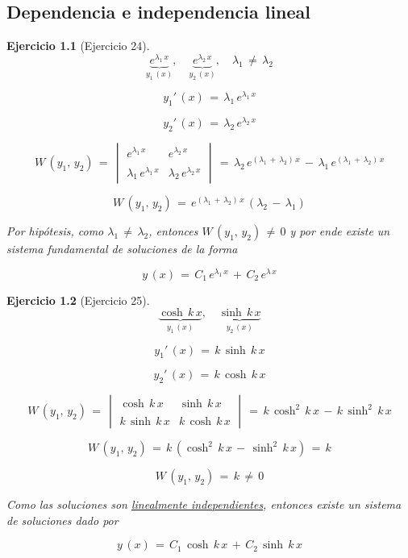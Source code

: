 \documentclass[a4paper,11pt, openany]{book}
\newtheorem{ejer}{Ejercicio}[section]
\begin{document}
 
\textcolor{awesome}{\chapter{Dependencia e independencia lineal}}  
 
\begin{ejer}[Ejercicio 24]
 
$$\underbrace{e^{\lambda_{1}\,x}}_{y_{1}\,(x)}, \quad \underbrace{e^{\lambda_{2}\,x}}_{y_{2}\,(x)}, \quad \lambda_{1}\,\neq\,\lambda_{2}$$
 
$$y_{1}'\,(x)\,=\,\lambda_{1}\,e^{\lambda_{1}\,x}$$
 
$$y_{2}'\,(x)\,=\,\lambda_{2}\,e^{\lambda_{2}\,x}$$
 
$$W\,\left(y_{1},\,y_{2} \right)\,=\,\begin{vmatrix}
e^{\lambda_{1}\,x} & e^{\lambda_{2}\,x} \\
\\
\lambda_{1}\,e^{\lambda_{1}\,x} & \lambda_{2}\,e^{\lambda_{2}\,x} 
\end{vmatrix}\,=\,\lambda_{2}\,e^{(\lambda_{1}\,+\,\lambda_{2})\,x}\,-\,\lambda_{1}\,e^{(\lambda_{1}\,+\,\lambda_{2})\,x}$$
 
$$W\,\left(y_{1},\,y_{2} \right)\,=\,e^{(\lambda_{1}\,+\,\lambda_{2})\,x}\,\left(\lambda_{2}\,-\,\lambda_{1} \right)$$
 
Por hipótesis, como $\lambda_{1}\,\neq\,\lambda_{2}$, entonces $W\,\left(y_{1},\,y_{2} \right)\,\neq\,0$ y por ende existe un sistema fundamental de soluciones de la forma
 
$$\boxed{y\,(x)\,=\,C_{1}\,e^{\lambda_{1}\,x}\,+\,C_{2}\,e^{\lambda\,x}}$$

\end{ejer}
 
\begin{ejer}[Ejercicio 25]
 
 
$$\underbrace{\cosh\,k\,x}_{y_{1}\,(x)}, \quad \underbrace{\sinh\,k\,x}_{y_{2}\,(x)}$$
 
$$y_{1}'\,(x)\,=\,k\,\sinh\,k\,x$$
 
$$y_{2}'\,(x)\,=\,k\,\cosh\,k\,x$$
 
$$W\,\left(y_{1},\,y_{2} \right)\,=\,\begin{vmatrix}
\cosh\,k\,x & \sinh\,k\,x \\
\\
k\,\sinh\,k\,x & k\,\cosh\,k\,x
\end{vmatrix}\,=\,k\,\cosh^{2}\,k\,x\,-\,k\,\sinh^{2}\,k\,x$$
 
$$W\,\left(y_{1},\,y_{2} \right)\,=\,k\,\left(\cosh^{2}\,k\,x\,-\,\sinh^{2}\,k\,x \right)\,=\,k$$
 
$$W\,\left(y_{1},\,y_{2} \right)\,=\,\boxed{k\,\neq\,0}$$
 
Como las soluciones son \underline{linealmente independientes}, entonces existe un sistema de soluciones dado por
 
$$\boxed{y\,(x)\,=\,C_{1}\,\cosh\,k\,x\,+\,C_{2}\,\sinh\,k\,x}$$

\end{ejer}
 
\end{document}
